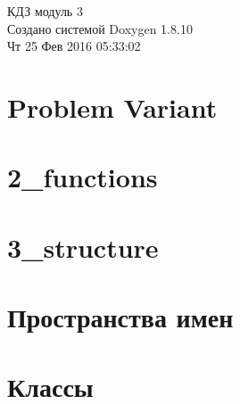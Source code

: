 \documentclass[twoside]{article}
\newcommand{\+}{\discretionary{\mbox{\scriptsize$\hookleftarrow$}}{}{}}
\newcommand{\clearemptydoublepage}{%
  \newpage{\pagestyle{empty}\cleardoublepage}%
}
\begin{document}
\begin{titlepage}
\vspace*{7cm}
\begin{center}%
{\Large КДЗ модуль 3 }\\
\vspace*{1cm}
{\large Создано системой Doxygen 1.8.10}\\
\vspace*{0.5cm}
{\small Чт 25 Фев 2016 05:33:02}\\
\end{center}
\end{titlepage}
\tableofcontents
{}

\section{Problem Variant}
\label{md_1_problem_variant}

\section{2\+\_\+functions}
\label{md_2_functions}

\section{3\+\_\+structure}
\label{md_3_structure}

\section{Пространства имен}

\section{Классы}















\newpage
{}
\clearemptydoublepage
{}
\printindex
\end{document}
